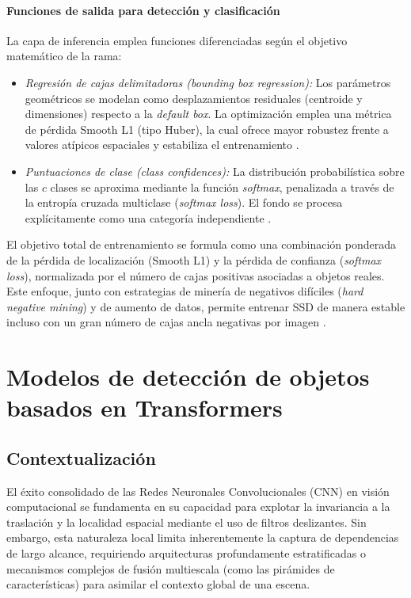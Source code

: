 \paragraph{Funciones de salida para detección y clasificación}

La capa de inferencia emplea funciones diferenciadas según el objetivo matemático de la rama:

\begin{itemize}
    \item \textit{Regresión de cajas delimitadoras (bounding box regression):} Los parámetros geométricos se modelan como desplazamientos residuales (centroide y dimensiones) respecto a la \textit{default box}. La optimización emplea una métrica de pérdida Smooth L1 (tipo Huber), la cual ofrece mayor robustez frente a valores atípicos espaciales y estabiliza el entrenamiento \cite{liu2016ssd}.
    \item \textit{Puntuaciones de clase (class confidences):} La distribución probabilística sobre las $c$ clases se aproxima mediante la función \textit{softmax}, penalizada a través de la entropía cruzada multiclase (\textit{softmax loss}). El fondo se procesa explícitamente como una categoría independiente \cite{liu2016ssd}.
\end{itemize}

El objetivo total de entrenamiento se formula como una combinación ponderada de la pérdida de localización (Smooth L1) y la pérdida de confianza (\textit{softmax loss}), normalizada por el número de cajas positivas asociadas a objetos reales. Este enfoque, junto con estrategias de minería de negativos difíciles (\textit{hard negative mining}) y de aumento de datos, permite entrenar SSD de manera estable incluso con un gran número de cajas ancla negativas por imagen \cite{liu2016ssd}.\\
\clearpage 
\section{Modelos de detección de objetos basados en Transformers}
\label{sec:transformers_detection}

\subsection{Contextualización}

El éxito consolidado de las Redes Neuronales Convolucionales (CNN) en visión computacional se fundamenta en su capacidad para explotar la invariancia a la traslación y la localidad espacial mediante el uso de filtros deslizantes. Sin embargo, esta naturaleza local limita inherentemente la captura de dependencias de largo alcance, requiriendo arquitecturas profundamente estratificadas o mecanismos complejos de fusión multiescala (como las pirámides de características) para asimilar el contexto global de una escena.\\

